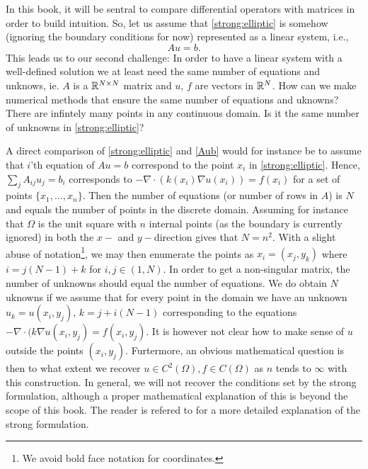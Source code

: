 In this book, it will be sentral to compare differential operators with matrices in order to build
intuition. So, let us assume that  
\eqref{strong:elliptic} is somehow (ignoring the boundary conditions for now)  represented as a linear system, i.e.,  
\begin{equation}
\label{Aub}
A u = b .  
\end{equation}
This leads us to our second challenge: In order to have a linear system with a well-defined solution we at least need the same number 
of equations and unknows, ie.  
$A$ is a $\mathbb{R}^{N\times N}$ matrix and $u$, $f$ are vectors in $\mathbb{R}^N$. How can we make numerical methods that ensure
the same number of equations and uknowns?  
There are infintely many points in any continuous domain. Is it the same number of unknowns in \eqref{strong:elliptic}? 

A direct comparison of \eqref{strong:elliptic} and \eqref{Aub} would for instance be to assume that $i$'th equation of $A u = b$ correspond to the point $x_i$ in
\eqref{strong:elliptic}. Hence, $\sum_j A_{ij} u_j = b_i$ corresponds
to $-\nabla\cdot(k(x_i) \nabla u(x_i))  = f(x_i)$ for a set of points $\{x_1, \ldots, x_n\}$.   
Then the number of equations (or number of rows in $A$) is $N$ and equals the number
of points in the discrete domain.  Assuming for instance
that $\Omega$ is the unit square with $n$ internal points (as the boundary is currently ignored) in both the $x-$ and $y-$direction 
gives that $N=n^2$. With a slight abuse of notation\footnote{We avoid bold face notation for coordinates. }, we may then enumerate the points as
$x_i = (x_j, y_k)$ where $i = j(N-1) + k$ for $i,j \in (1, N)$.  
In order to get a non-singular matrix, the number of unknowns should
equal the number of equations. We do obtain $N$ uknowns if we assume that for every
point in the domain we have an unknown $u_k = u(x_i, y_j)$, $k=j+i(N-1)$ corresponding to  
the equations 
$-\nabla\cdot (k \nabla  u(x_i, y_j) = f(x_i, y_j)$. It is however not clear how to make sense of $u$ outside the points $(x_i, y_j)$.      
Furtermore, an obvious mathematical question is then to what extent we recover $ u \in C^2(\Omega), f \in C(\Omega)$ as $n$ tends to $\infty$
with this construction. In general, we will not recover the conditions set by the strong formulation, although a proper mathematical 
explanation of this is beyond the scope of this book. The reader is refered to \cite{evans2022partial} for a more detailed
explanation of the strong formulation. 


